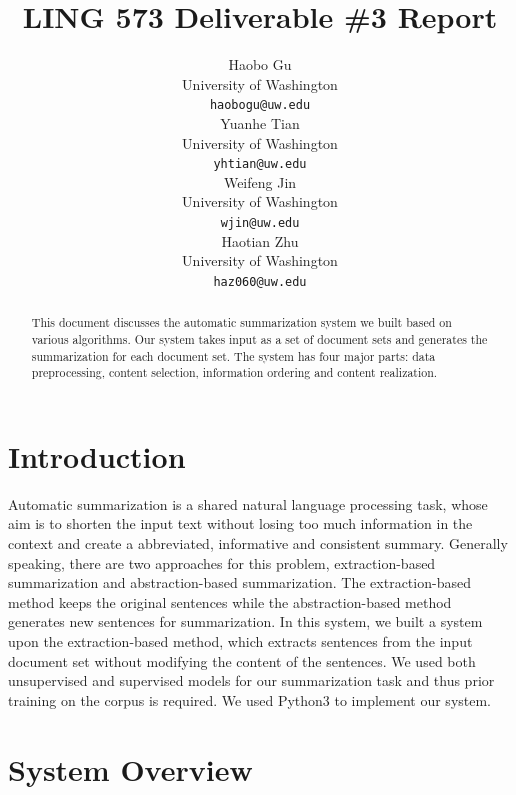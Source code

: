 \documentclass[11pt]{article}
\title{LING 573 Deliverable \#3 Report}
\author{Haobo Gu \\
  \small University of Washington \\
  {\tt haobogu@uw.edu} \\\And
 Yuanhe Tian \\
 \small University of Washington \\
  {\tt yhtian@uw.edu}\\\And
 Weifeng Jin \\
 \small University of Washington \\
  {\tt wjin@uw.edu} \\\And
 Haotian Zhu \\
 \small University of Washington \\
  {\tt haz060@uw.edu}\\}
\date{}
\begin{document}
\maketitle
\begin{abstract}

This document discusses the automatic summarization system we built based on various algorithms. Our system takes input as a set of document sets and generates the summarization for each document set. The system has four major parts: data preprocessing, content selection, information ordering and content realization.

\end{abstract}

\section{Introduction}

Automatic summarization is a shared natural language processing task, whose aim is to shorten the input text without losing too much information in the context and create a abbreviated, informative and consistent summary. Generally speaking, there are two approaches for this problem, extraction-based summarization and abstraction-based summarization. The extraction-based method keeps the original sentences while the abstraction-based method generates new sentences for summarization. In this system, we built a system upon the extraction-based method, which extracts sentences from the input document set without modifying the content of the sentences. We used both unsupervised and supervised models for our summarization task and thus prior training on the corpus is required. We used Python3 to implement our system.
\section{System Overview}
\end{document}
